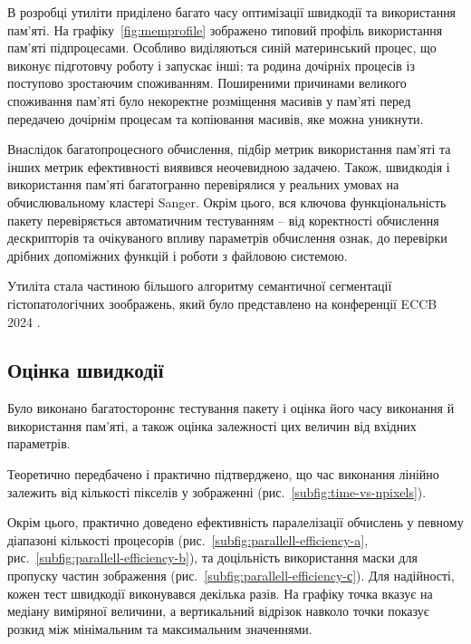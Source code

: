 В розробці утиліти приділено багато часу оптимізації швидкодії та використання пам'яті. 
На графіку~\ref{fig:memprofile} зображено типовий профіль використання пам'яті підпроцесами.
Особливо виділяються синій материнський процес, що виконує підготовчу роботу і запускає інші; 
та родина дочірніх процесів із поступово зростаючим споживанням.
Поширеними причинами великого споживання пам'яті було некоректне розміщення масивів у пам'яті перед передачею дочірнім процесам 
та копіювання масивів, яке можна уникнути. 

Внаслідок багатопроцесного обчислення, підбір метрик використання пам'яті та інших метрик ефективності виявився неочевидною задачею.
Також, швидкодія і використання пам'яті багатогранно перевірялися у реальних умовах на обчислювальному кластері Sanger.
Окрім цього, вся ключова функціональність пакету перевіряється автоматичним тестуванням -- від коректності обчислення дескрипторів та очікуваного впливу параметрів обчислення ознак, 
до перевірки дрібних допоміжних функцій і роботи з файловою системою. 

Утиліта стала частиною більшого алгоритму семантичної сегментації гістопатологічних зоображень, 
який було представлено на конференції ECCB 2024 \cite{fastlbp2024}.

\subsection{Оцінка швидкодії}\label{section2.2d}
Було виконано багатостороннє тестування пакету і оцінка його часу виконання й використання пам'яті, 
а також оцінка залежності цих величин від вхідних параметрів.

Теоретично передбачено і практично підтверджено, що час виконання лінійно залежить від кількості пікселів у зображенні (рис.~\ref{subfig:time-vs-npixels}).

Окрім цього, практично доведено ефективність паралелізації обчислень у певному діапазоні кількості процесорів (рис.~\ref{subfig:parallell-efficiency-a}, рис.~\ref{subfig:parallell-efficiency-b}),
та доцільність використання маски для пропуску частин зображення (рис.~\ref{subfig:parallell-efficiency-с}).
Для надійності, кожен тест швидкодії виконувався декілька разів. На графіку точка вказує на медіану виміряної величини, 
а вертикальний відрізок навколо точки показує розкид між мінімальним та максимальним значеннями.

